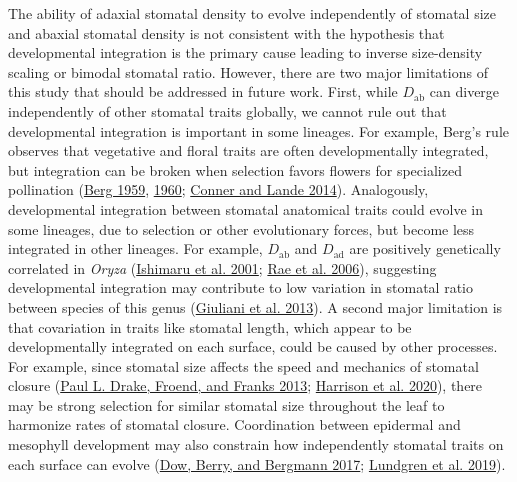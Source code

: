 \documentclass[
  10pt,
]{article}
\begin{document}
The ability of adaxial stomatal density to evolve independently of stomatal size and abaxial stomatal density is not consistent with the hypothesis that developmental integration is the primary cause leading to inverse size-density scaling or bimodal stomatal ratio. However, there are two major limitations of this study that should be addressed in future work. First, while \(D_\text{ab}\) can diverge independently of other stomatal traits globally, we cannot rule out that developmental integration is important in some lineages. For example, Berg's rule observes that vegetative and floral traits are often developmentally integrated, but integration can be broken when selection favors flowers for specialized pollination (\protect\hyperlink{ref-berg_general_1959}{Berg 1959}, \protect\hyperlink{ref-berg_ecological_1960}{1960}; \protect\hyperlink{ref-conner_raissa_2014}{Conner and Lande 2014}). Analogously, developmental integration between stomatal anatomical traits could evolve in some lineages, due to selection or other evolutionary forces, but become less integrated in other lineages. For example, \(D_\text{ab}\) and \(D_\text{ad}\) are positively genetically correlated in \emph{Oryza} (\protect\hyperlink{ref-ishimaru_identification_2001}{Ishimaru et al. 2001}; \protect\hyperlink{ref-rae_elucidating_2006}{Rae et al. 2006}), suggesting developmental integration may contribute to low variation in stomatal ratio between species of this genus (\protect\hyperlink{ref-giuliani_coordination_2013}{Giuliani et al. 2013}). A second major limitation is that covariation in traits like stomatal length, which appear to be developmentally integrated on each surface, could be caused by other processes. For example, since stomatal size affects the speed and mechanics of stomatal closure (\protect\hyperlink{ref-drake_smaller_2013}{Paul L. Drake, Froend, and Franks 2013}; \protect\hyperlink{ref-harrison_influence_2020}{Harrison et al. 2020}), there may be strong selection for similar stomatal size throughout the leaf to harmonize rates of stomatal closure. Coordination between epidermal and mesophyll development may also constrain how independently stomatal traits on each surface can evolve (\protect\hyperlink{ref-dow_disruption_2017}{Dow, Berry, and Bergmann 2017}; \protect\hyperlink{ref-lundgren_mesophyll_2019}{Lundgren et al. 2019}).
\end{document}
